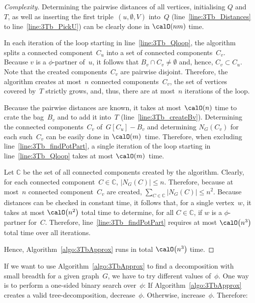 \begin{proof}
    [Complexity]
Determining the pairwise distances of all vertices, initialising $Q$ and~$T$, as well as inserting the first triple~$(u, \emptyset, V)$ into~$Q$ (line~\ref{line:3Tb_Distances} to line~\ref{line:3Tb_PickU}) can be clearly done in $\calO(nm)$ time.

In each iteration of the loop starting in line~\ref{line:3Tb_Qloop}, the algorithm splits a connected component~$C_u$ into a set of connected components~$C_v$.
Because $v$ is a $\phi$-partner of~$u$, it follows that $B_v \cap C_v \neq \emptyset$ and, hence, $C_v \subset C_u$.
Note that the created components~$C_v$ are pairwise disjoint.
Therefore, the algorithm creates at most~$n$ connected components~$C_v$, the set of vertices covered by~$T$ strictly grows, and, thus, there are at most~$n$ iterations of the loop.

Because the pairwise distances are known, it takes at most~$\calO(n)$ time to crate the bag~$B_v$ and to add it into~$T$ (line~\ref{line:3Tb_createBv}).
Determining the connected components~$C_v$ of~$G[C_u] - B_v$ and determining $N_G(C_v)$ for each such~$C_v$ can be easily done in $\calO(m)$~time.
Therefore, when excluding line~\ref{line:3Tb_findPotPart}, a single iteration of the loop starting in line~\ref{line:3Tb_Qloop} takes at most $\calO(m)$~time.

Let $\mathbb{C}$ be the set of all connected components created by the algorithm.
Clearly, for each connected component~$C \in \mathbb{C}$, $|N_G(C)| \leq n$.
Therefore, because at most~$n$ connected component~$C_v$ are created, $\sum_{C \in \mathbb{C}} |N_G(C)| \leq n^2$.
Because distances can be checked in constant time, it follows that, for a single vertex~$w$, it takes at most $\calO \big( n^2 \big)$ total time to determine, for all $C \in \mathbb{C}$, if $w$ is a $\phi$-partner for~$C$.
Therefore, line~\ref{line:3Tb_findPotPart} requires at most $\calO \big( n^3 \big)$ total time over all iterations.

Hence, Algorithm~\ref{algo:3TbApprox} runs in total $\calO \big( n^3 \big)$ time.
\end{proof}

If we want to use Algorithm~\ref{algo:3TbApprox} to find a decomposition with small breadth for a given graph~$G$, we have to try different values of~$\phi$.
One way is to perform a one-sided binary search over~$\phi$:
If Algorithm~\ref{algo:3TbApprox} creates a valid tree-decomposition, decrease~$\phi$.
Otherwise, increase~$\phi$.
Therefore:

